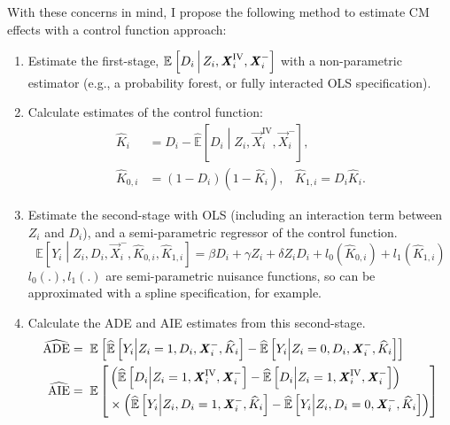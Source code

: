 With these concerns in mind, I propose the following method to estimate CM effects with a control function approach:
\begin{enumerate}
    \item Estimate the first-stage, $\mathbb{E}_{} \left[ D_i \, \middle\vert \, Z_i, \boldsymbol{\mathit{X}}_i^{\text{IV}}, \boldsymbol{\mathit{X}}_i^- \right]$ with a non-parametric estimator (e.g., a probability forest, or fully interacted OLS specification).
    \item Calculate estimates of the control function:
    \begin{align*}
        \hat K_i &= D_i - \hat{\mathbb E} \left[D_i \middle\vert Z_i, \vec X_i^{\text{IV}}, \vec X_i^- \right], \\
        \hat K_{0,i} &= (1 - D_i) (1 - \hat K_i), \;\;\;
            \hat K_{1,i} = D_i \hat K_i.
    \end{align*}
    \item Estimate the second-stage with OLS (including an interaction term between $Z_i$ and $D_i$), and a semi-parametric regressor of the control function.
    \[ \mathbb{E} \left[Y_i \middle\vert Z_i, D_i, \vec X_i^-, \hat K_{0,i}, \hat K_{1,i}\right]
    = \beta D_i + \gamma Z_i + \delta Z_i D_i + l_0\left( \hat K_{0,i}\right) + l_1 \left( \hat K_{1,i} \right) \]
    $l_0(.), l_1(.)$ are semi-parametric nuisance functions, so can be approximated with a spline specification, for example.
    \item Calculate the ADE and AIE estimates from this second-stage.
    \begin{align*}
        \widehat{\text{ADE}} &= \; \mathbb{E}_{} \left[ 
            \widehat{\mathbb{E}} \left[ Y_i \middle\vert Z_i = 1, D_i, \boldsymbol{\mathit{X}}_i^-, \widehat{K}_i \right]
            - \widehat{\mathbb{E}} \left[ Y_i \middle\vert Z_i = 0, D_i, \boldsymbol{\mathit{X}}_i^-, \widehat{K}_i \right] \right] \\
        \widehat{\text{AIE}} &= \; \mathbb E \left[ \begin{aligned} &\left(
            \widehat{\mathbb{E}} \left[D_i \middle\vert Z_i = 1, \boldsymbol{\mathit{X}}_i^{\text{IV}}, \boldsymbol{\mathit{X}}_i^-\right]
            - \widehat{\mathbb{E}} \left[D_i \middle\vert Z_i = 1, \boldsymbol{\mathit{X}}_i^{\text{IV}}, \boldsymbol{\mathit{X}}_i^-\right] \right) \\
            &\times \left(
                \widehat{\mathbb{E}} \left[ Y_i \middle\vert Z_i, D_i = 1, \boldsymbol{\mathit{X}}_i^-, \widehat{K}_i \right]
            - \widehat{\mathbb{E}} \left[ Y_i \middle\vert Z_i, D_i = 0, \boldsymbol{\mathit{X}}_i^-, \widehat{K}_i \right]
            \right) \end{aligned} \right]
    \end{align*}

\end{enumerate}
